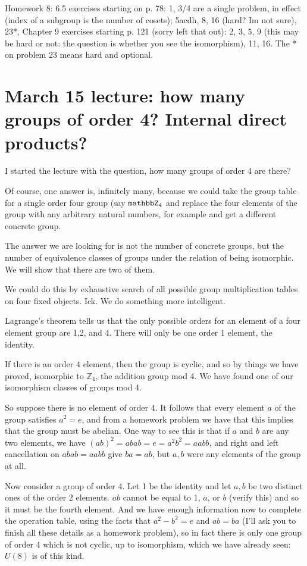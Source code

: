 \documentclass[12pt]{article}
\begin{document}
Homework 8: 6.5 exercises starting on p. 78: 1, 3/4 are a single problem, in effect (index of a subgroup is the number of cosets); 5acdh, 8, 16 (hard? Im not sure), 23*, Chapter 9 exercises starting p. 121 (sorry left that out): 2, 3, 5, 9 (this may be hard or not: the question is whether you see the isomorphism), 11, 16. The * on problem 23 means hard and optional.

\section{March 15 lecture:  how many groups of order 4?  Internal direct products?}

I started the lecture with the question, how many groups of order 4 are there?

Of course, one answer is, infinitely many, because we could take the group table for a single order four group (say ${\tt mathbb Z}_4$ and replace the four elements of the group with any arbitrary natural numbers, for example and get a different concrete group.

The answer we are looking for is not the number of concrete groups, but the number of equivalence classes of groups under the relation of being isomorphic.  We will show that there are two of them.

We could do this by exhaustive search of all possible group multiplication tables on four fixed objects.  Ick.  We do something more intelligent.

Lagrange's theorem tells us that the only possible orders for an element of a four element group are 1,2, and 4.
There will only be one order 1 element, the identity.  

If there is an order 4 element, then the group is cyclic,
and so by things we have proved, isomorphic to ${\mathbb Z}_4$, the addition group mod 4.  We have found one of our isomorphism classes of groups mod 4.  

So  suppose there is no element of order 4.  It follows that every element $a$ of the group satisfies $a^2 = e$,
and from a homework problem we have that this implies that the group must be abelian.   One way to see this is that if $a$ and $b$ are any two elements, we have $(ab)^2 = abab= e = a^2b^2 = aabb$, and right and left cancellation on
$abab=aabb$ give $ba=ab$, but $a,b$ were any elements of the group at all.

Now consider a group of order 4.  Let 1 be the identity and let $a,b$ be two distinct ones of the order 2 elements.  $ab$ cannot be equal to 1, $a$, or $b$ (verify this) and so it must be the fourth element.  And we have enough information now to complete the operation table, using the facts that $a^2-b^2=e$ and $ab=ba$ (I'll ask you to finish all these details as a homework problem), so in fact there is only one group of order 4 which is not cyclic, up to isomorphism, which we have already seen:  $U(8)$ is of this kind.
\end{document}
